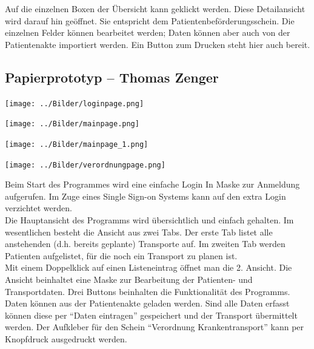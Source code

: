 \documentclass[a4paper, ngerman, 12pt]{scrartcl}
\begin{document}
\hspace{0.05\textwidth}
\begin{minipage}{0.55\textwidth}
Auf die einzelnen Boxen der Übersicht kann geklickt werden. Diese Detailansicht wird darauf hin geöffnet. Sie entspricht dem Patientenbeförderungsschein. Die einzelnen Felder können bearbeitet werden; Daten können aber auch von der Patientenakte importiert werden. Ein Button zum Drucken steht hier auch bereit.\vspace{5cm}\\
\end{minipage}
\subsection{Papierprototyp – Thomas Zenger}
\begin{center}
\begin{minipage}[b]{0.48\textwidth}
	\centering
	\texttt{[image: ../Bilder/loginpage.png]}
	\label{img:zenger1}
\end{minipage}
\begin{minipage}[b]{0.48\textwidth}
	\centering
	\texttt{[image: ../Bilder/mainpage.png]}
	\label{img:zenger2}
\end{minipage}
\end{center}
\begin{center}
\begin{minipage}[b]{0.48\textwidth}
	\centering
	\texttt{[image: ../Bilder/mainpage\_1.png]}
	\label{img:zenger3}
\end{minipage}
\begin{minipage}[b]{0.48\textwidth}
	\centering
	\texttt{[image: ../Bilder/verordnungpage.png]}
	\label{img:zenger4}
\end{minipage}
\end{center}
Beim Start des Programmes wird eine einfache Login In Maske zur Anmeldung aufgerufen. Im Zuge eines Single Sign-on Systems kann auf den extra Login verzichtet werden.\\
Die Hauptansicht des Programms wird übersichtlich und einfach gehalten. Im wesentlichen besteht die Ansicht aus zwei Tabs. Der erste Tab listet alle anstehenden (d.h. bereits geplante) Transporte auf. Im zweiten Tab werden Patienten aufgelistet, für die noch ein Transport zu planen ist.\\
Mit einem Doppelklick auf einen Listeneintrag öffnet man die 2. Ansicht. Die Ansicht beinhaltet eine Maske zur Bearbeitung der Patienten- und Transportdaten. Drei Buttons beinhalten die Funktionalität des Programms. Daten können aus der Patientenakte geladen werden. Sind alle Daten erfasst können diese per ``Daten eintragen'' gespeichert und der Transport übermittelt werden. Der Aufkleber für den Schein ``Verordnung Krankentransport'' kann per Knopfdruck ausgedruckt werden.
\end{document}
